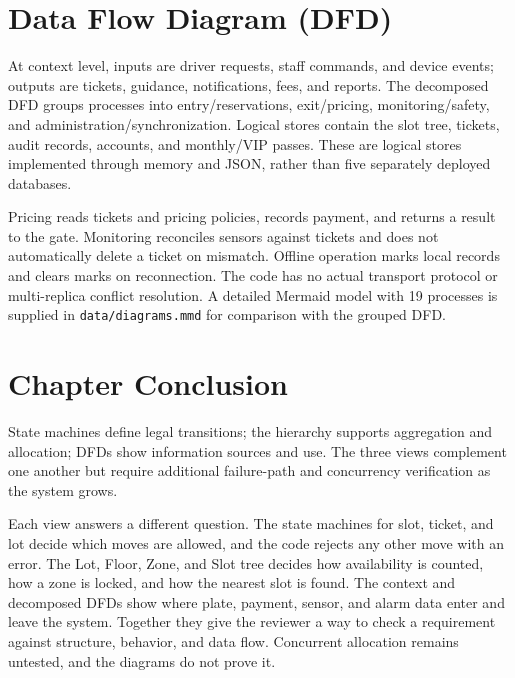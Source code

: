 \section{Data Flow Diagram (DFD)}

At context level, inputs are driver requests, staff commands, and device events; outputs are tickets, guidance, notifications, fees, and reports. The decomposed DFD groups processes into entry/reservations, exit/pricing, monitoring/safety, and administration/synchronization. Logical stores contain the slot tree, tickets, audit records, accounts, and monthly/VIP passes. These are logical stores implemented through memory and JSON, rather than five separately deployed databases.

Pricing reads tickets and pricing policies, records payment, and returns a result to the gate. Monitoring reconciles sensors against tickets and does not automatically delete a ticket on mismatch. Offline operation marks local records and clears marks on reconnection. The code has no actual transport protocol or multi-replica conflict resolution. A detailed Mermaid model with 19 processes is supplied in \texttt{data/diagrams.mmd} for comparison with the grouped DFD.

\section{Chapter Conclusion}
State machines define legal transitions; the hierarchy supports aggregation and allocation; DFDs show information sources and use. The three views complement one another but require additional failure-path and concurrency verification as the system grows.

Each view answers a different question. The state machines for slot, ticket, and lot decide which moves are allowed, and the code rejects any other move with an error. The Lot, Floor, Zone, and Slot tree decides how availability is counted, how a zone is locked, and how the nearest slot is found. The context and decomposed DFDs show where plate, payment, sensor, and alarm data enter and leave the system. Together they give the reviewer a way to check a requirement against structure, behavior, and data flow. Concurrent allocation remains untested, and the diagrams do not prove it.

